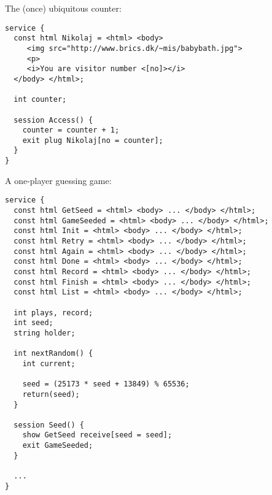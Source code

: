 \begin{slide*}
The (once) ubiquitous counter:

\begin{scriptsize}
\begin{verbatim}
service {
  const html Nikolaj = <html> <body>
     <img src="http://www.brics.dk/~mis/babybath.jpg">
     <p>
     <i>You are visitor number <[no]></i>
  </body> </html>;

  int counter;

  session Access() {
    counter = counter + 1;
    exit plug Nikolaj[no = counter];
  }
}
\end{verbatim}
\end{scriptsize}
\begin{center}
\end{center}

\vfil
\end{slide*}

\begin{slide*}
A one-player guessing game:

\begin{scriptsize}
\begin{verbatim}
service {
  const html GetSeed = <html> <body> ... </body> </html>;
  const html GameSeeded = <html> <body> ... </body> </html>;
  const html Init = <html> <body> ... </body> </html>;
  const html Retry = <html> <body> ... </body> </html>;
  const html Again = <html> <body> ... </body> </html>; 
  const html Done = <html> <body> ... </body> </html>; 
  const html Record = <html> <body> ... </body> </html>;
  const html Finish = <html> <body> ... </body> </html>;
  const html List = <html> <body> ... </body> </html>; 

  int plays, record;
  int seed;
  string holder;

  int nextRandom() {
    int current;
    
    seed = (25173 * seed + 13849) % 65536;
    return(seed); 
  } 
  
  session Seed() {
    show GetSeed receive[seed = seed];
    exit GameSeeded;
  } 

  ...
}
\end{verbatim}
\end{scriptsize}
\vfil
\end{slide*}
 
